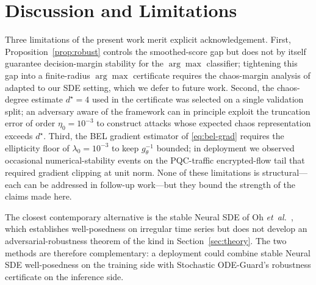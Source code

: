 \documentclass[journal,10pt]{IEEEtran}
\theoremstyle{definition}
\theoremstyle{remark}
\begin{document}
\section{Discussion and Limitations}\label{sec:disc}
Three limitations of the present work merit explicit acknowledgement.
First, Proposition~\ref{prop:robust} controls the smoothed-score gap
but does not by itself guarantee decision-margin stability for the
$\arg\max$ classifier; tightening this gap into a finite-radius
$\arg\max$ certificate requires the chaos-margin analysis of
\cite{salman2019smoothadv} adapted to our SDE setting, which we defer
to future work. Second, the chaos-degree estimate $d^\star=4$ used in
the certificate was selected on a single validation split; an
adversary aware of the framework can in principle exploit the
truncation error of order $\eta_0=10^{-3}$ to construct attacks whose
expected chaos representation exceeds $d^\star$. Third, the BEL
gradient estimator of \eqref{eq:bel-grad} requires the ellipticity
floor of $\lambda_0=10^{-3}$ to keep $g_\theta^{-1}$ bounded; in
deployment we observed occasional numerical-stability events on the
PQC-traffic encrypted-flow tail that required gradient clipping at
unit norm. None of these limitations is structural---each can be
addressed in follow-up work---but they bound the strength of the
claims made here.

The closest contemporary alternative is the stable Neural SDE of
Oh \textit{et~al.}~\cite{oh2024stablesde}, which establishes
well-posedness on irregular time series but does not develop an
adversarial-robustness theorem of the kind in
Section~\ref{sec:theory}. The two methods are therefore complementary:
a deployment could combine stable Neural SDE well-posedness on the
training side with Stochastic ODE-Guard's robustness certificate on
the inference side.

\end{document}
